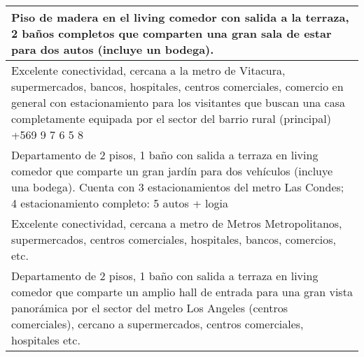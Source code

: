 \begin{table}[H]
\begin{tabular}{|m{50em}|}
\hline Piso de madera en el living comedor con salida a la terraza, 2 baños completos que comparten una gran sala de estar para dos autos (incluye un bodega). \\
\hline Excelente conectividad, cercana a la metro de Vitacura, supermercados, bancos, hospitales, centros comerciales, comercio en general con estacionamiento para los visitantes que buscan una casa completamente equipada por el sector del barrio rural (principal) +569 9 7 6 5 8 \\
\hline Departamento de 2 pisos, 1 baño con salida a terraza en living comedor que comparte un gran jardín para dos vehículos (incluye una bodega). Cuenta con 3 estacionamientos del metro Las Condes; 4 estacionamiento completo: 5 autos + logia \\
\hline Excelente conectividad, cercana a metro de Metros Metropolitanos, supermercados, centros comerciales, hospitales, bancos, comercios, etc. \\
\hline Departamento de 2 pisos, 1 baño con salida a terraza en living comedor que comparte un amplio hall de entrada para una gran vista panorámica por el sector del metro Los Angeles (centros comerciales), cercano a supermercados, centros comerciales, hospitales etc. \\
\hline
\end{tabular}
\end{table}
